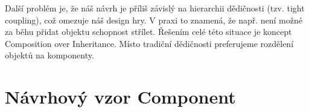 Další problém je, že náš návrh je příliš závislý na hierarchii dědičnosti (tzv. tight coupling), což omezuje náš design hry. V praxi to znamená, že např. není možné za běhu přidat objektu schopnost střílet. Řešením celé této situace je koncept Composition over Inheritance. Místo tradiční dědičnosti preferujeme rozdělení objektů na komponenty.

\section{Návrhový vzor Component}



